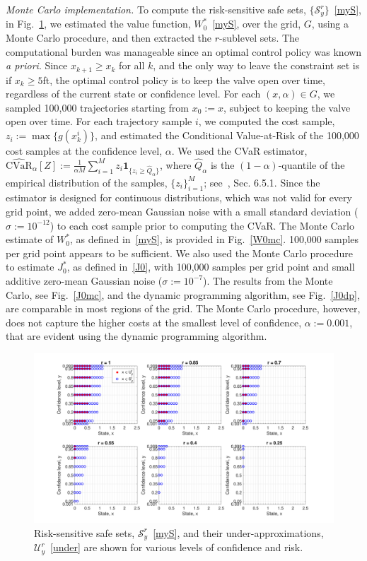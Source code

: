 \documentclass[letterpaper, 10 pt, conference]{ieeeconf}  %
\begin{document}
\textit{Monte Carlo implementation.}
To compute the risk-sensitive safe sets, $\{\mathcal{S}_y^r\}$~\eqref{myS}, in Fig.~\ref{compare}, 
we estimated the value function, $W_0^*$~\eqref{myS}, over the grid, $G$, using a Monte Carlo procedure,
and then extracted the $r$-sublevel sets.
The computational burden was manageable since an optimal control policy was known \textit{a priori}.
Since $x_{k+1}\geq x_k$ for all $k$, and the only way to leave the constraint set is if $x_k \geq 5$ft,
the optimal control policy is to keep the valve open over time, regardless of the current state or confidence level.
For each $(x,\alpha) \in G$, we sampled 100,000 trajectories starting from $x_0 := x$, subject to keeping the valve open over time.
For each trajectory sample $i$, we computed the cost sample, $z_i := \max\{g(x_k^i)\}$, and estimated the Conditional Value-at-Risk
of the 100,000 cost samples at the confidence level, $\alpha$. 
We used the CVaR estimator, $\hat{\text{CVaR}}_\alpha[Z] := \frac{1}{\alpha M}\sum_{i=1}^M z_i \textbf{1}_{\{z_i\geq \hat{Q}_\alpha\}}$,
where $\hat{Q}_\alpha$ is the $(1-\alpha)$-quantile of the empirical distribution of the samples, $\{z_i\}_{i=1}^M$; see~\cite{shapiro2009lectures}, Sec. 6.5.1.
Since the estimator is designed for continuous distributions, which was not valid for every grid point,
we added zero-mean Gaussian noise with a small standard deviation ($\sigma := 10^{-12}$) to each cost sample prior to computing the CVaR.
The Monte Carlo estimate of $W_0^*$, as defined in~\eqref{myS}, is provided in Fig.~\ref{W0mc}.
100,000 samples per grid point appears to be sufficient. We also used the Monte Carlo procedure to estimate $J_0^*$, as defined in~\eqref{J0},
with 100,000 samples per grid point and small additive zero-mean Gaussian noise ($\sigma := 10^{-7}$). 
The results from the Monte Carlo, see Fig.~\ref{J0mc}, and the dynamic programming algorithm, see Fig.~\ref{J0dp}, are comparable
in most regions of the grid. The Monte Carlo procedure, however, does not capture the higher costs at the smallest level of confidence, $\alpha := 0.001$,
that are evident using the dynamic programming algorithm.   

\begin{figure}[thpb]
      \centering
      \includegraphics[scale=0.3]{output_CompareScript_Sept112018.pdf}
      \caption{ Risk-sensitive safe sets, $\mathcal{S}_y^r$~\eqref{myS}, and their under-approximations, $\mathcal{U}_y^r$~\eqref{under}
		are shown for various levels of confidence and risk. } 
      \label{compare}
\end{figure}
\end{document}
